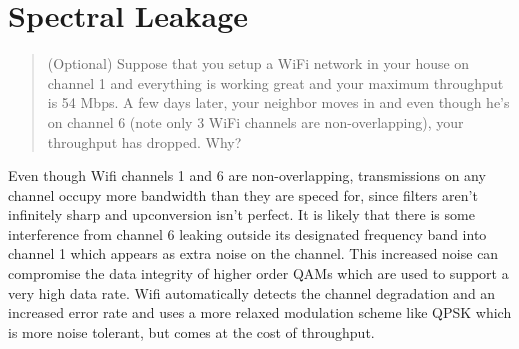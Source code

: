 \documentclass[11pt]{article}
\begin{document}
\section{Spectral Leakage}
\begin{quote}
	(Optional) Suppose that you setup a WiFi network in your house on channel 1 and everything is working great and your maximum throughput is 54 Mbps. A few days later, your neighbor moves in and even though he's on channel 6 (note only 3 WiFi channels are non-overlapping), your throughput has dropped. Why?
\end{quote}

Even though Wifi channels 1 and 6 are non-overlapping, transmissions on any channel occupy more bandwidth than they are speced for, since filters aren't infinitely sharp and upconversion isn't perfect. It is likely that there is some interference from channel 6 leaking outside its designated frequency band into channel 1 which appears as extra noise on the channel. This increased noise can compromise the data integrity of higher order QAMs which are used to support a very high data rate. Wifi automatically detects the channel degradation and an increased error rate and uses a more relaxed modulation scheme like QPSK which is more noise tolerant, but comes at the cost of throughput.
\end{document}
